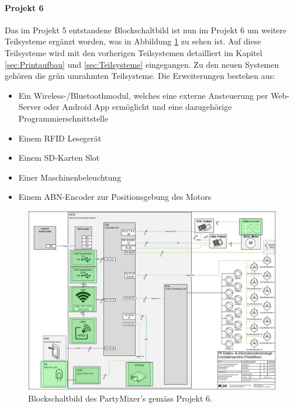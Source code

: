 \paragraph{Projekt 6}\mbox{}

Das im Projekt 5 entstandene Blockschaltbild ist nun im Projekt 6 um weitere Teilsysteme ergänzt worden, was in Abbildung \ref{fig:Blockschaltbild_Partymixer} zu sehen ist. Auf diese Teilsysteme wird mit den vorherigen Teilsystemen detailliert im Kapitel \ref{sec:Printaufbau} und \ref{sec:Teilsysteme} eingegangen. Zu den neuen Systemen gehören die grün umrahmten Teilsysteme. Die Erweiterungen bestehen aus:

\begin{itemize}
\item Ein Wireless-/Bluetoothmodul, welches eine externe Ansteuerung per Web-Server oder Android App ermöglicht und eine dazugehörige Programmierschnittstelle 
\item Einem RFID Lesegerät
\item Einem SD-Karten Slot
\item Einer Maschinenbeleuchtung 
\item Einem ABN-Encoder zur Positionsgebung des Motors
\end{itemize}
\mbox{}



\begin{figure}[h!]
\center
\includegraphics[angle=90, width = \textwidth]{graphics/Blockschaltbild}
\caption{Blockschaltbild des PartyMixer's gemäss Projekt 6.}
\label{fig:Blockschaltbild_Partymixer}
\end{figure}

\newpage

